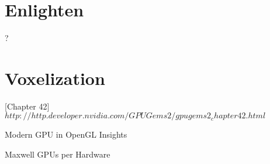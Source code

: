 \documentclass[thesis.tex]{subfiles}
\begin{document}
\section{Enlighten}?


\section{Voxelization}

\cite{bib:GPUGems2}[Chapter 42] $http://http.developer.nvidia.com/GPUGems2/gpugems2_chapter42.html$

Modern GPU in OpenGL Insights \cite{bib:openglinsightsvoxel}

Maxwell GPUs per Hardware

\subfilebib %
\end{document}
